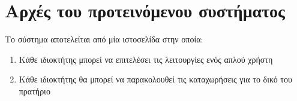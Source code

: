 \section{Αρχές του προτεινόμενου συστήματος}

Το σύστημα αποτελείται από μία ιστοσελίδα στην οποία:
\begin{enumerate}
	\item Κάθε ιδιοκτήτης μπορεί να επιτελέσει τις λειτουργίες ενός απλού χρήστη
	\item Κάθε ιδιοκτήτης θα μπορεί να παρακολουθεί τις καταχωρήσεις για το δικό του πρατήριο
\end{enumerate}

